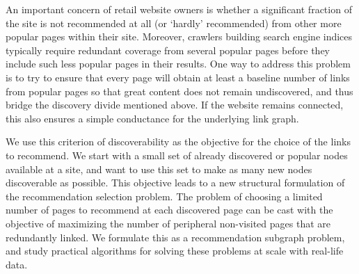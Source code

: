 An important concern of retail website owners is whether a significant fraction of the site is not recommended at all (or `hardly' recommended) from other more popular pages within their site. Moreover, crawlers building search engine indices typically require redundant coverage from several popular pages before they include such less popular pages in their results.
One way to address this
problem is to try to ensure that every page will obtain at least a baseline number of links from popular pages so that great content does not remain undiscovered, and thus bridge the discovery divide mentioned above. If the website
remains connected, this also ensures a simple conductance for the underlying link graph. \vs


We use this criterion of discoverability as the objective for the choice of the links to recommend. 
We start with a small set of already discovered or popular nodes available at a site, and want to use this set to make as many new nodes discoverable as possible. This objective leads to a new structural formulation of the recommendation selection problem. The problem of choosing a limited number of pages to recommend at each discovered page can be cast with the objective of maximizing the number of peripheral non-visited pages that are redundantly linked. We formulate this as a recommendation subgraph problem, and study practical algorithms for solving these problems at scale with real-life data.\vs

